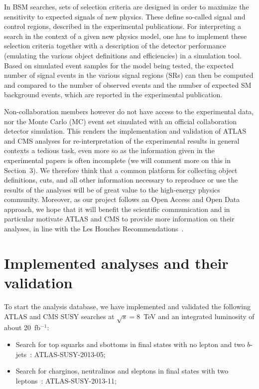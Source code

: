 In BSM searches, sets of selection criteria are designed in order to maximize the sensitivity to expected signals of new physics. These define so-called signal and control regions, described in the experimental publications. 
For interpreting a search in the context of a given new physics model, one has to implement these selection criteria together with a description of the detector performance (emulating the various object definitions and efficiencies) in a simulation tool. 
Based on simulated event samples for the model being tested,  the expected number of signal events  in the various signal regions (SRs) can then be computed and compared to the number of observed events and the number of expected SM background events, which are reported in the experimental publication.  

Non-collaboration members however do not have access to the experimental data, nor the Monte Carlo (MC) event set 
simulated with an official collaboration detector simulation. This renders the implementation and validation 
of ATLAS and CMS analyses for re-interpretation of the experimental results in general contexts 
a tedious task, even more so as the information given in the experimental papers is often incomplete (we will comment more on this in Section~3).  
We therefore think that a common platform for collecting object definitions, cuts, and all other information 
necessary to reproduce or use the results of the analyses will be of great value to the high-energy physics community.  
Moreover, as our project follows an Open Access and Open Data approach, we hope that it will benefit the 
scientific communication and in particular motivate ATLAS and CMS to provide more information 
on their analyses, in line with the Les Houches Recommendations~\cite{Kraml:2012sg}.



\section{Implemented analyses and their validation}\label{sec:implemended}


To start the analysis database, we have implemented and validated the following ATLAS and CMS SUSY 
searches at $\sqrt{s}=8$~TeV and an integrated luminosity of about 20~fb$^{-1}$: \\

\begin{itemize}
\item Search for top squarks and sbottoms in final states with no lepton and two $b$-jets~\cite{MA5-ATLAS-SUSY-2013-05}: ATLAS-SUSY-2013-05;\\
\item Search for charginos, neutralinos and sleptons in final states with two leptons~\cite{MA5-ATLAS-SUSY-2013-11}: ATLAS-SUSY-2013-11;\\
\end{itemize}

